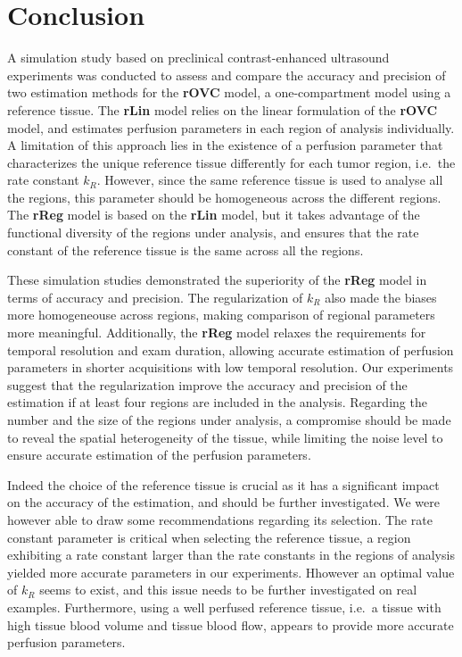 \section{Conclusion}
A simulation study based on preclinical contrast-enhanced ultrasound experiments was conducted to assess and compare the accuracy and precision of two estimation methods for the \textbf{rOVC} model, a one-compartment model using a reference tissue.
The \textbf{rLin} model relies on the linear formulation of the \textbf{rOVC} model, and estimates perfusion parameters in each region of analysis individually.
A limitation of this approach lies in the existence of a perfusion parameter that characterizes the unique reference tissue differently for each tumor region, i.e.~the rate constant $k_R$.
However, since the same reference tissue is used to analyse all the regions, this parameter should be homogeneous across the different regions.
The \textbf{rReg} model is based on the \textbf{rLin} model, but it takes advantage of the functional diversity of the regions under analysis, and ensures that the rate constant of the reference tissue is the same across all the regions.

These simulation studies demonstrated the superiority of the \textbf{rReg} model in terms of accuracy and precision.
The regularization of $k_R$ also made the biases more homogeneouse across regions, making comparison of regional parameters more meaningful.
Additionally, the \textbf{rReg} model relaxes the requirements for temporal resolution and exam duration, allowing accurate estimation of perfusion parameters in shorter acquisitions with low temporal resolution.
Our experiments suggest that the regularization improve the accuracy and precision of the estimation if at least four regions are included in the analysis.
Regarding the number and the size of the regions under analysis, a compromise should be made to reveal the spatial heterogeneity of the tissue, while limiting the noise level to ensure accurate estimation of the perfusion parameters.

Indeed the choice of the reference tissue is crucial as it has a significant impact on the accuracy of the estimation, and should be further investigated.
We were however able to draw some recommendations regarding its selection.
The rate constant parameter is critical when selecting the reference tissue, a region exhibiting a rate constant larger than the rate constants in the regions of analysis yielded more accurate parameters in our experiments.
Hhowever an optimal value of $k_R$ seems to exist, and this issue needs to be further investigated on real examples.
Furthermore, using a well perfused reference tissue, i.e.~a tissue with high tissue blood volume and tissue blood flow, appears to provide more accurate perfusion parameters.